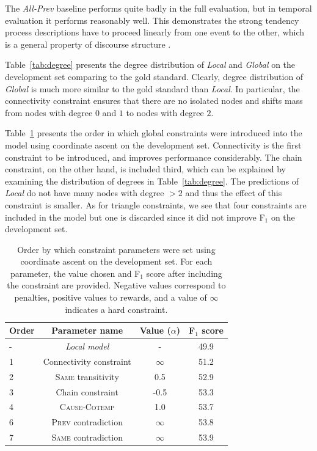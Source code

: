 The \emph{All-Prev} baseline performs quite badly in the full evaluation, but in temporal evaluation it performs reasonably well. This demonstrates the strong tendency process descriptions have to proceed linearly from one event to the other, which is a general property of discourse structure \cite{schegloff73}.

Table~\ref{tab:degree} presents the degree distribution of \emph{Local} and \emph{Global} on the development set comparing to the gold standard. Clearly, degree distribution of \emph{Global} is much more similar to the gold standard than \emph{Local}. In particular, the connectivity constraint ensures that there are no isolated nodes and shifts mass from nodes with degree $0$ and $1$ to nodes with degree $2$.

Table~\ref{tab:paramtuning} presents the order in which global constraints were introduced into the model using coordinate ascent on the development set. Connectivity is the first constraint to be introduced, and improves performance considerably. The chain constraint, on the other hand, is included third, which can be explained by examining the distribution of degrees in Table~\ref{tab:degree}. The predictions of \emph{Local} do not have many nodes with degree $>2$ and thus the effect of this constraint is smaller. As for triangle constraints, we see that four constraints are included in the model but one is discarded since it did not improve F$_1$ on the development set.

\begin{table}[t]
{\footnotesize
\begin{tabular}{| l | c | c | c |}
\hline
    \textbf{Order} & \textbf{Parameter name} & \textbf{Value} ($\alpha$)& \textbf{F$_1$ score} \\
\hline
\hline
- & \emph{Local model} & - & 49.9 \\
1 & Connectivity constraint & $\infty$ & 51.2 \\
2 & \textsc{Same} transitivity &  0.5 & 52.9 \\
3 & Chain constraint & -0.5 & 53.3\\
4 & \textsc{Cause}-\textsc{Cotemp} & 1.0 & 53.7\\
6 & \textsc{Prev} contradiction & $\infty$ & 53.8\\
7 & \textsc{Same} contradiction & $\infty$ & 53.9\\

\hline
\end{tabular}}
\caption{Order by which constraint parameters were set using coordinate ascent on the development set. For each parameter, the value chosen and F$_1$ score after including the constraint are provided. Negative values correspond to penalties, positive values to rewards, and a value of $\infty$ indicates a hard constraint.}
\label{tab:paramtuning}
\end{table}

